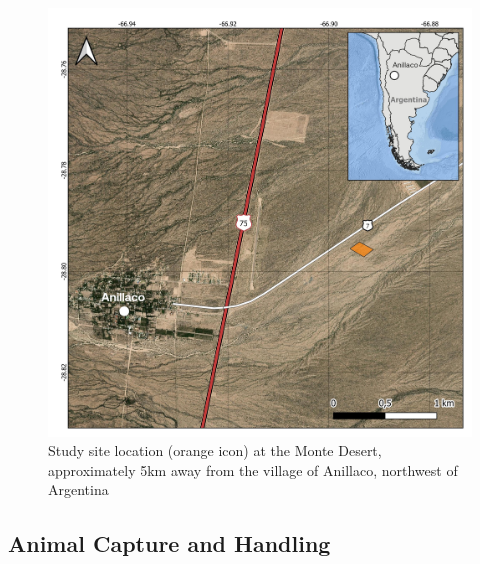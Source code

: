 \documentclass[english,msc,numbers,hidelinks]{coppe}
\begin{document}
  \begin{figure}

  {\centering \includegraphics[width=1\linewidth]{../04_figures/map/tuco_map} 

  }

  \caption{Study site location (orange icon) at the Monte Desert, approximately 5km away from the village of Anillaco, northwest of Argentina}\label{fig:methods-map}
  \end{figure}
  \hypertarget{animal-capture-and-handling}{%
  \subsection{Animal Capture and Handling}\label{animal-capture-and-handling}}
\end{document}
